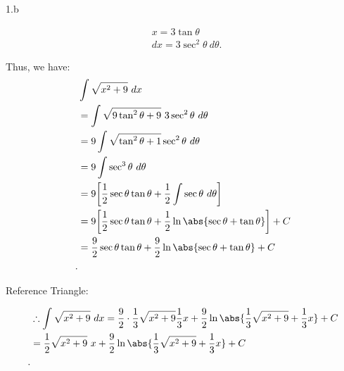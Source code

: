\documentclass{report}
\begin{document}
    \pagebreak \bigbreak \noindent 
    1.b
    \bigbreak \noindent 
    \begin{minipage}[t]{0.47\textwidth}
        \begin{align*}
            &x = 3\tan{\theta } \\
            &dx = 3\sec^{2}{\theta}\ d\theta 
        .\end{align*} 
    \end{minipage}
    \begin{minipage}[t]{0.47\textwidth}
        Thus, we have:
    \begin{align*}
        &\int \sqrt{x^{2} + 9}\ dx  \\
        &= \int \sqrt{9\tan^{2}{\theta } + 9}\ 3\sec^{2}{\theta }\ d\theta  \\
        &=9 \int \sqrt{\tan^{2}{\theta }+1}\sec^{2}{\theta }\ d\theta  \\
        &=9\int \sec^{3}{\theta }\ d\theta  \\
        &= 9\bigg[\frac{1}{2}\sec{\theta }\tan{\theta } + \frac{1}{2}\int \sec{\theta }\ d\theta \bigg] \\
        &= 9\bigg[\frac{1}{2}\sec{\theta }\tan{\theta }+\frac{1}{2}\ln{\abs{\sec{\theta }  +\tan{\theta }}}\bigg] + C \\
        &= \frac{9}{2}\sec{\theta }\tan{\theta } + \frac{9}{2} \ln{\abs{\sec{\theta } + \tan{\theta }}}  + C \\
    .\end{align*}
    \end{minipage}
    \bigbreak \noindent 
    \begin{minipage}[]{0.47\textwidth}
        Reference Triangle:
        \bigbreak \noindent 
    \end{minipage}
    \begin{minipage}[]{0.47\textwidth}
        \begin{align*}
            &\therefore \int \sqrt{x^{2} + 9}\ dx = \frac{9}{2} \cdot \frac{1}{3}\sqrt{x^{2}+9}\frac{1}{3}x +\frac{9}{2}\ln{\abs{\frac{1}{3}\sqrt{x^{2}+9} + \frac{1}{3}x}} + C \\
            &=\frac{1}{2}\sqrt{x^{2}+9}\ x +\frac{9}{2}\ln{\abs{\frac{1}{3}\sqrt{x^{2}+9} + \frac{1}{3}x}} + C \\
        .\end{align*}
    \end{minipage}
\end{document}

